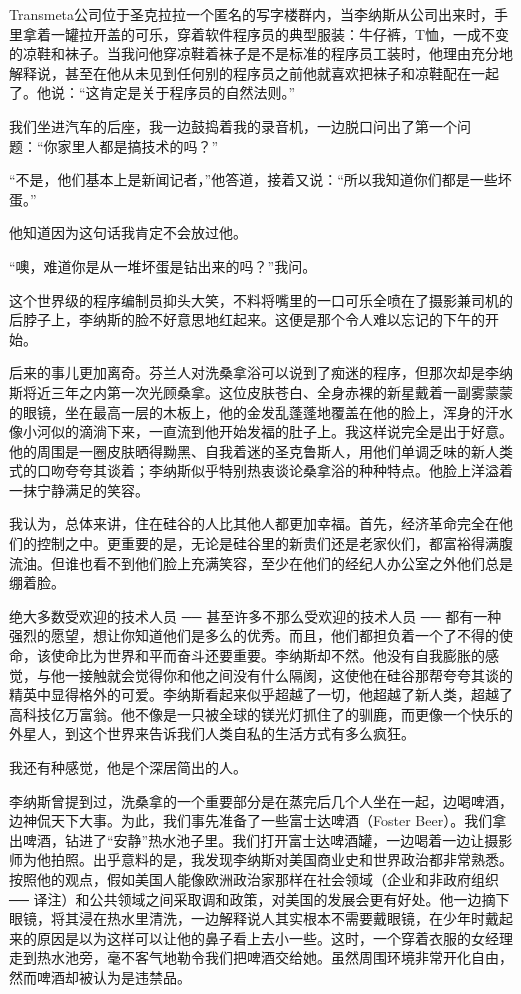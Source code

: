 Transmeta公司位于圣克拉拉一个匿名的写字楼群内，当李纳斯从公司出来时，手里拿着一罐拉开盖的可乐，穿着软件程序员的典型服装：牛仔裤，T恤，一成不变的凉鞋和袜子。当我问他穿凉鞋着袜子是不是标准的程序员工装时，他理由充分地解释说，甚至在他从未见到任何别的程序员之前他就喜欢把袜子和凉鞋配在一起了。他说：“这肯定是关于程序员的自然法则。”

我们坐进汽车的后座，我一边鼓捣着我的录音机，一边脱口问出了第一个问题：“你家里人都是搞技术的吗？”

“不是，他们基本上是新闻记者，”他答道，接着又说：“所以我知道你们都是一些坏蛋。”

他知道因为这句话我肯定不会放过他。

“噢，难道你是从一堆坏蛋是钻出来的吗？”我问。

这个世界级的程序编制员抑头大笑，不料将嘴里的一口可乐全喷在了摄影兼司机的后脖子上，李纳斯的脸不好意思地红起来。这便是那个令人难以忘记的下午的开始。

后来的事儿更加离奇。芬兰人对洗桑拿浴可以说到了痴迷的程序，但那次却是李纳斯将近三年之内第一次光顾桑拿。这位皮肤苍白、全身赤裸的新星戴着一副雾蒙蒙的眼镜，坐在最高一层的木板上，他的金发乱蓬蓬地覆盖在他的脸上，浑身的汗水像小河似的滴淌下来，一直流到他开始发福的肚子上。我这样说完全是出于好意。他的周围是一圈皮肤晒得黝黑、自我着迷的圣克鲁斯人，用他们单调乏味的新人类式的口吻夸夸其谈着；李纳斯似乎特别热衷谈论桑拿浴的种种特点。他脸上洋溢着一抹宁静满足的笑容。

我认为，总体来讲，住在硅谷的人比其他人都更加幸福。首先，经济革命完全在他们的控制之中。更重要的是，无论是硅谷里的新贵们还是老家伙们，都富裕得满腹流油。但谁也看不到他们脸上充满笑容，至少在他们的经纪人办公室之外他们总是绷着脸。

绝大多数受欢迎的技术人员 ── 甚至许多不那么受欢迎的技术人员 ── 都有一种强烈的愿望，想让你知道他们是多么的优秀。而且，他们都担负着一个了不得的使命，该使命比为世界和平而奋斗还要重要。李纳斯却不然。他没有自我膨胀的感觉，与他一接触就会觉得你和他之间没有什么隔阂，这使他在硅谷那帮夸夸其谈的精英中显得格外的可爱。李纳斯看起来似乎超越了一切，他超越了新人类，超越了高科技亿万富翁。他不像是一只被全球的镁光灯抓住了的驯鹿，而更像一个快乐的外星人，到这个世界来告诉我们人类自私的生活方式有多么疯狂。

我还有种感觉，他是个深居简出的人。

李纳斯曾提到过，洗桑拿的一个重要部分是在蒸完后几个人坐在一起，边喝啤酒，边神侃天下大事。为此，我们事先准备了一些富士达啤酒（Foster Beer）。我们拿出啤酒，钻进了“安静”热水池子里。我们打开富士达啤酒罐，一边喝着一边让摄影师为他拍照。出乎意料的是，我发现李纳斯对美国商业史和世界政治都非常熟悉。按照他的观点，假如美国人能像欧洲政治家那样在社会领域（企业和非政府组织 ── 译注）和公共领域之间采取调和政策，对美国的发展会更有好处。他一边摘下眼镜，将其浸在热水里清洗，一边解释说人其实根本不需要戴眼镜，在少年时戴起来的原因是以为这样可以让他的鼻子看上去小一些。这时，一个穿着衣服的女经理走到热水池旁，毫不客气地勒令我们把啤酒交给她。虽然周围环境非常开化自由，然而啤酒却被认为是违禁品。

